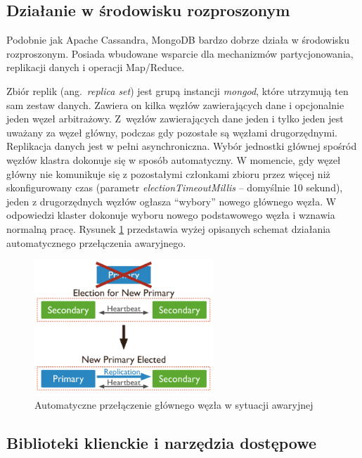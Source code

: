 \subsection{Działanie w środowisku rozproszonym}

Podobnie jak Apache Cassandra, MongoDB bardzo dobrze działa w środowisku rozproszonym.
Posiada wbudowane wsparcie dla mechanizmów partycjonowania, replikacji danych i operacji Map/Reduce.

Zbiór replik (ang.~\textit{replica set}) jest grupą instancji \textit{mongod}, które utrzymują ten sam zestaw danych.
Zawiera on kilka węzłów zawierających dane i opcjonalnie jeden węzeł arbitrażowy.
Z~węzłów zawierających dane jeden i tylko jeden jest uważany za węzeł główny, podczas gdy pozostałe są węzłami drugorzędnymi.
Replikacja danych jest w pełni asynchroniczna.
Wybór jednostki głównej spośród węzłów klastra dokonuje się w sposób automatyczny.
W momencie, gdy węzeł główny nie komunikuje się z pozostałymi członkami zbioru przez więcej niż skonfigurowany czas (parametr \textit{electionTimeoutMillis} -- domyślnie 10 sekund), jeden z drugorzędnych węzłów ogłasza \enquote{wybory} nowego głównego węzła.
W odpowiedzi klaster dokonuje wyboru nowego podstawowego węzła i wznawia normalną pracę. Rysunek \ref{fig:mongoAutoFailover} przedstawia wyżej opisanych schemat działania automatycznego przełączenia awaryjnego.

\begin{figure}[!ht]
\centering
\includegraphics[width=0.6\textwidth]{figures/replica-set-trigger-election.png}
\caption{Automatyczne przełączenie głównego węzła w sytuacji awaryjnej \cite{MongoDBReplication}}
\label{fig:mongoAutoFailover}
\end{figure}

\subsection{Biblioteki klienckie i narzędzia dostępowe}

